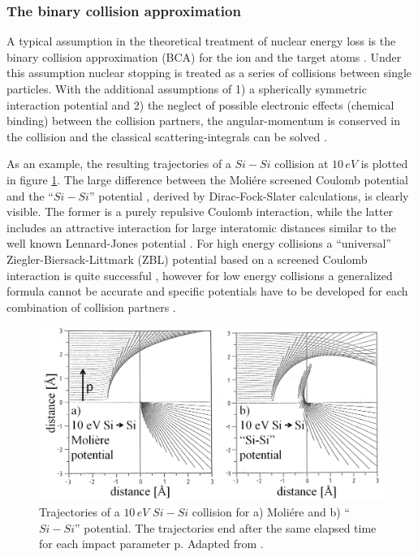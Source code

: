 
\subsubsection{The binary collision approximation}

A typical assumption in the theoretical treatment of nuclear energy loss is the binary collision approximation (BCA) for the ion and the target atoms \cite{eckstein_computer_1991}. Under this assumption nuclear stopping is treated as a series of collisions between single particles. With the additional assumptions of 1) a spherically symmetric interaction potential and 2) the neglect of possible electronic effects (chemical binding) between the collision partners, the angular-momentum is conserved in the collision and the classical scattering-integrals can be solved \cite{ziegler_stopping_1985}. 

As an example, the resulting trajectories of a $Si-Si$ collision at $10\,eV$ is plotted in figure \ref{SiSi}. The large difference between the Moliére screened Coulomb potential \cite{moliere_theorie_1947} and the ``$Si-Si$'' potential \cite{hackel_inter-nuclear_1990}, derived by Dirac-Fock-Slater calculations, is clearly visible. The former is a purely repulsive Coulomb interaction, while the latter includes an attractive interaction for large interatomic distances similar to the well known Lennard-Jones potential \cite{jones_determination_1924,eckstein_computer_1991}. For high energy collisions a ``universal'' Ziegler-Biersack-Littmark (ZBL) potential based on a screened Coulomb interaction is quite successful \cite{ziegler_stopping_1985}, however for low energy collisions a generalized formula cannot be accurate and specific potentials have to be developed for each combination of collision partners \cite{dedkov_interatomic_1995,nordlund_repulsive_1997,albe_modeling_2002,nordlund_interatomic_2008}.

\begin{figure}
	\centering
		\includegraphics[width=.75\textwidth]{images/SiSicollision.png}
	\caption{Trajectories of a $10\,eV$ $Si-Si$ collision for a) Moliére and b) ``$Si-Si$'' potential. The trajectories end after the same elapsed time for each impact parameter p. Adapted from \cite{eckstein_computer_1991}.}
	\label{SiSi}
\end{figure} 


